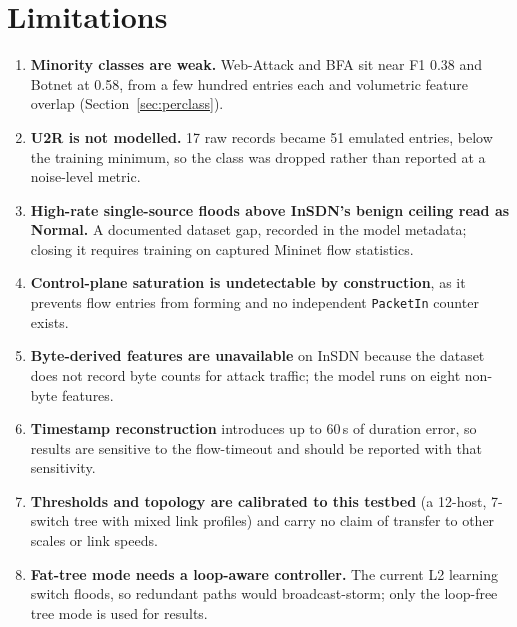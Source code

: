 \documentclass[11pt]{article}
\begin{document}
\section{Limitations}
\begin{enumerate}
    \item \textbf{Minority classes are weak.} Web-Attack and BFA sit near F1 0.38 and
    Botnet at 0.58, from a few hundred entries each and volumetric feature overlap
    (Section~\ref{sec:perclass}).
    \item \textbf{U2R is not modelled.} 17 raw records became 51 emulated entries, below
    the training minimum, so the class was dropped rather than reported at a noise-level
    metric.
    \item \textbf{High-rate single-source floods above InSDN's benign ceiling read as
    Normal.} A documented dataset gap, recorded in the model metadata; closing it requires
    training on captured Mininet flow statistics.
    \item \textbf{Control-plane saturation is undetectable by construction}, as it prevents
    flow entries from forming and no independent \texttt{PacketIn} counter exists.
    \item \textbf{Byte-derived features are unavailable} on InSDN because the dataset does
    not record byte counts for attack traffic; the model runs on eight non-byte features.
    \item \textbf{Timestamp reconstruction} introduces up to 60\,s of duration error, so
    results are sensitive to the flow-timeout and should be reported with that sensitivity.
    \item \textbf{Thresholds and topology are calibrated to this testbed} (a 12-host,
    7-switch tree with mixed link profiles) and carry no claim of transfer to other scales
    or link speeds.
    \item \textbf{Fat-tree mode needs a loop-aware controller.} The current L2 learning
    switch floods, so redundant paths would broadcast-storm; only the loop-free tree mode
    is used for results.
\end{enumerate}
\end{document}
